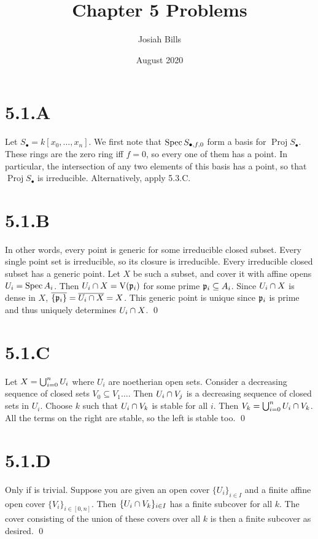 \documentclass{article}
\title{Chapter 5 Problems}
\author{Josiah Bills}
\date{August 2020}
\begin{document}
\maketitle

\section{5.1.A}
Let $S_{\bullet}=k[x_0, \dots, x_n]$. We first note that $\operatorname{Spec} S_{\bullet, f, 0}$ form a
basis for $\operatorname{Proj} S_{\bullet}$. These rings are the zero ring iff
$f=0$, so every one of them has a point. In particular, the
intersection of any two elements of this basis has a point, so that
$\operatorname{Proj} S_{\bullet}$ is irreducible. Alternatively, apply 5.3.C.

\section{5.1.B}
In other words, every point is generic for some irreducible closed subset.
Every single point set is irreducible, so its closure is irreducible. Every
irreducible closed subset has a generic point. Let $X$ be
such a subset, and cover it with affine opens $U_i=\operatorname{Spec} A_i$. Then
$U_i \cap X=\operatorname{V}(\mathfrak{p}_i)$ for some prime $\mathfrak{p}_i \subseteq A_i$. Since
$U_i \cap X$ is dense in $X$,
$\overline{\{\mathfrak{p}_i\}}=\overline{U_i \cap X}=X$. This generic point is unique since
$\mathfrak{p}_i$ is prime and thus uniquely determines
$U_i \cap X$. \qed

\section{5.1.C}
Let $X=\bigcup_{i=0}^n U_i$ where $U_i$ are noetherian open
sets. Consider a decreasing sequence of closed sets $V_0 \subseteq V_1 \dots$.
Then $U_i \cap V_j$ is a decreasing sequence of closed sets in
$U_i$. Choose $k$ such that
$U_i \cap V_k$ is stable for all $i$. Then
$V_k=\bigcup_{i=0}^n U_i \cap V_k$. All the terms on the right are stable, so the left is
stable too. \qed

\section{5.1.D}
Only if is trivial. Suppose you are given an open cover $\{U_i\}_{i \in I}$
and a finite affine open cover $\{V_i\}_{i \in [0, n]}$. Then
$\{U_i\cap V_k\}_{i \in I}$ has a finite subcover for all $k$.
The cover consisting of the union of these covers over all
$k$ is then a finite subcover as desired. \qed
\end{document}
